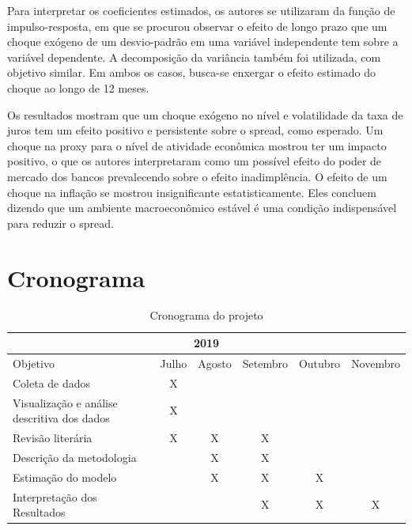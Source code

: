 \documentclass[a4paper, article, 12pt, openany, oneside, english, brazil]{abntex2}
\begin{document}
    Para interpretar os coeficientes estimados, os autores se utilizaram da função de impulso-resposta, em que se procurou observar o efeito de longo prazo que um choque exógeno de um desvio-padrão em uma variável independente tem sobre a variável dependente. A decomposição da variância também foi utilizada, com objetivo similar. Em ambos os casos, busca-se enxergar o efeito estimado do choque ao longo de 12 meses.

    Os resultados mostram que um choque exógeno no nível e volatilidade da taxa de juros tem um efeito positivo e persistente sobre o spread, como esperado. Um choque na proxy para o nível de atividade econômica mostrou ter um impacto positivo, o que os autores interpretaram como um possível efeito do poder de mercado dos bancos prevalecendo sobre o efeito inadimplência. O efeito de um choque na inflação se mostrou insignificante estatisticamente. Eles concluem dizendo que um ambiente macroeconômico estável é uma condição indispensável para reduzir o spread.

\section{Cronograma}
\begin{table}[h]
  \centering
  \begin{tabular}{|l||c|c|c|c|c|}
    \hline
    \multicolumn{6}{|c|}{2019}         \\
    \hline
    \hline
    Objetivo                                     & Julho  &  Agosto  &  Setembro  &  Outubro  &  Novembro \\
    \hline
    Coleta de dados                              & X    &         &        &         &        \\
    Visualização e análise descritiva dos dados  & X    &         &        &         &        \\
    Revisão literária                            & X    &  X      &  X     &         &        \\
    Descrição da metodologia                     &      &  X      &  X     &         &        \\
    Estimação do modelo                          &      &  X      &  X     &  X      &        \\
    Interpretação dos Resultados                 &      &         &  X     &  X      &  X     \\
    \hline
  \end{tabular}
  \caption{Cronograma do projeto}
\end{table}


\end{document}
